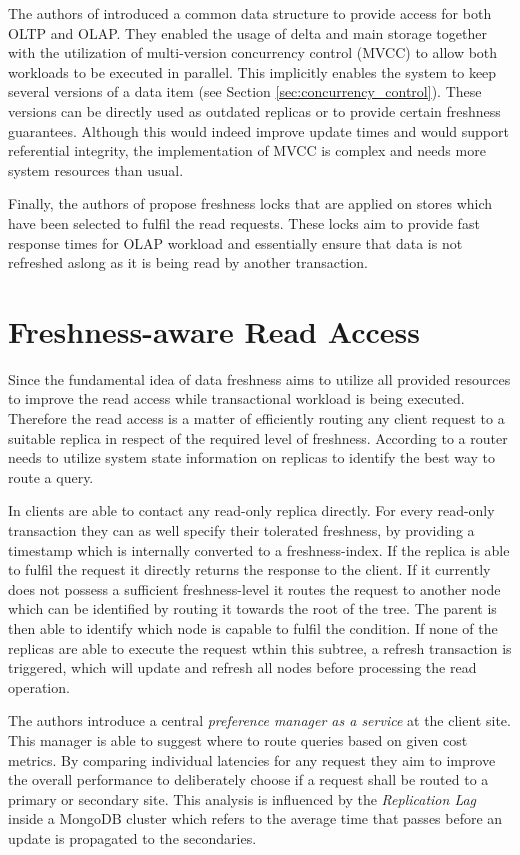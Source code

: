 The authors of \cite{psaroudakis:2015} introduced a common data structure to provide access for both OLTP and OLAP. 
They enabled the usage of delta and main storage together with the utilization of multi-version concurrency control (MVCC) to allow both workloads to be executed in parallel.
This implicitly enables the system to keep several versions of a data item (see Section \ref{sec:concurrency_control}).
These versions can be directly used as outdated replicas or to provide certain freshness guarantees.
Although this would indeed improve update times and would support referential integrity, the implementation of MVCC is complex and needs more system resources than usual.

Finally, the authors of \cite{akal:2005} propose freshness locks that are applied on stores which have been selected to fulfil the read requests. 
These locks aim to provide fast response times for OLAP workload and essentially ensure that data is not refreshed aslong as it is being read by another transaction.



\section{Freshness-aware Read Access}
\label{r:read}
Since the fundamental idea of data freshness aims to utilize all provided resources to improve the read access while transactional workload is being executed.
Therefore the read access is a matter of efficiently routing any client request to a suitable replica in respect of the required level of freshness.
According to \cite{rohm:2002, akal:2005} a router needs to utilize system state information on replicas to identify the best way to route a query.

In \cite{voicu:2010} clients are able to contact any read-only replica directly. For every read-only transaction they can as well specify
their tolerated freshness, by providing a timestamp which is internally converted to a freshness-index. If the replica is able to fulfil the request 
it directly returns the response to the client. If it currently does not possess a sufficient freshness-level it routes the request to another node which can be identified 
by routing it towards the root of the tree. The parent is then able to identify which node is capable to fulfil the condition.  
If none of the replicas are able to execute the request wthin this subtree, a refresh transaction is triggered, which will update and refresh all nodes before 
processing the read operation.

The authors \cite{huang:2020} introduce a central \emph{preference manager as a service} at the client site. This manager is able to suggest where to route queries 
based on given cost metrics. By comparing individual latencies for any request they aim to improve the overall performance to deliberately choose if a request 
shall be routed to a primary or secondary site. This analysis is influenced by the \emph{Replication Lag} inside a MongoDB cluster which refers to the average time 
that passes before an update is propagated to the secondaries. 




